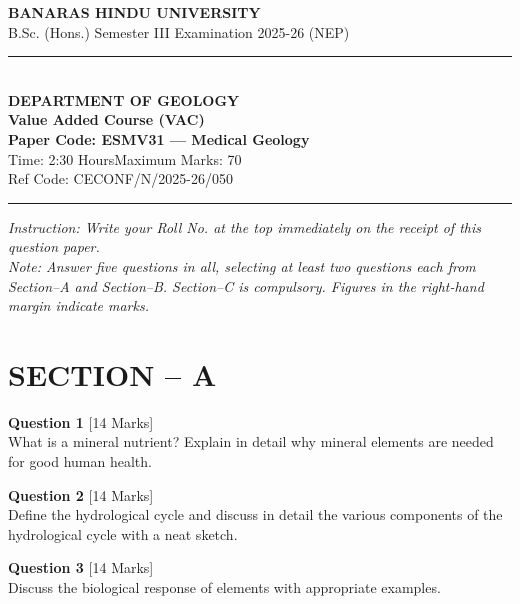 \documentclass[11pt,a4paper]{article}
\begin{document}
\begin{center}
  {\large\bfseries BANARAS HINDU UNIVERSITY}\\[2pt]
  {\normalsize B.Sc. (Hons.) Semester III Examination 2025-26 (NEP)}\\[6pt]
  \rule{0.8\linewidth}{0.5pt}\\[6pt]
  {\large\bfseries DEPARTMENT OF GEOLOGY}\\[4pt]
  {\large\bfseries Value Added Course (VAC)}\\[4pt]
  {\large\bfseries Paper Code: ESMV31 --- Medical Geology}\\[4pt]
  {\normalsize Time: 2:30 Hours\hfill Maximum Marks: 70}\\[2pt]
  {\small Ref Code: CECONF/N/2025-26/050}
\end{center}

\rule{\linewidth}{0.4pt}\smallskip



\noindent   \textit{Instruction: Write your Roll No. at the top immediately on the receipt of this question paper.}\\[2pt]



\noindent   \textit{Note: Answer five questions in all, selecting at least two questions each from Section--A and Section--B. Section--C is compulsory. Figures in the right-hand margin indicate marks.}
\bigskip

\section*{SECTION -- A}




\noindent   \textbf{Question 1} \hfill [14 Marks]\\
What is a mineral nutrient? Explain in detail why mineral elements are needed for good human health.

\bigskip




\noindent   \textbf{Question 2} \hfill [14 Marks]\\
Define the hydrological cycle and discuss in detail the various components of the hydrological cycle with a neat sketch.

\bigskip




\noindent   \textbf{Question 3} \hfill [14 Marks]\\
Discuss the biological response of elements with appropriate examples.
\end{document}
